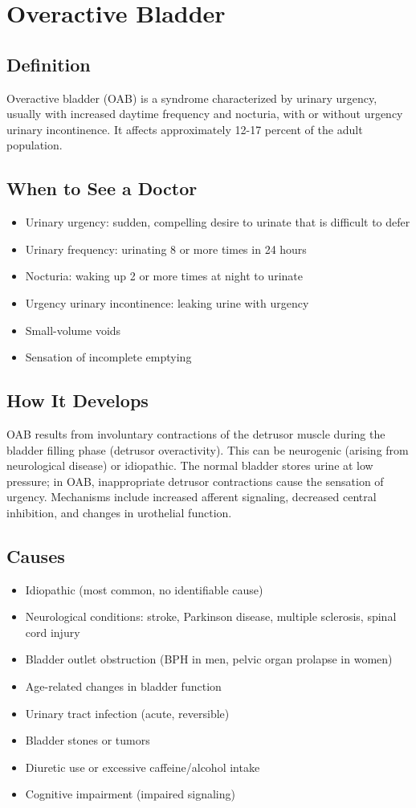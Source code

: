 \chapter{Overactive Bladder}

\section*{Definition}
Overactive bladder (OAB) is a syndrome characterized by urinary urgency, usually with increased daytime frequency and nocturia, with or without urgency urinary incontinence. It affects approximately 12-17 percent of the adult population.

\section*{When to See a Doctor}
\begin{itemize}
\item Urinary urgency: sudden, compelling desire to urinate that is difficult to defer
\item Urinary frequency: urinating 8 or more times in 24 hours
\item Nocturia: waking up 2 or more times at night to urinate
\item Urgency urinary incontinence: leaking urine with urgency
\item Small-volume voids
\item Sensation of incomplete emptying
\end{itemize}

\section*{How It Develops}
OAB results from involuntary contractions of the detrusor muscle during the bladder filling phase (detrusor overactivity). This can be neurogenic (arising from neurological disease) or idiopathic. The normal bladder stores urine at low pressure; in OAB, inappropriate detrusor contractions cause the sensation of urgency. Mechanisms include increased afferent signaling, decreased central inhibition, and changes in urothelial function.

\section*{Causes}
\begin{itemize}
\item Idiopathic (most common, no identifiable cause)
\item Neurological conditions: stroke, Parkinson disease, multiple sclerosis, spinal cord injury
\item Bladder outlet obstruction (BPH in men, pelvic organ prolapse in women)
\item Age-related changes in bladder function
\item Urinary tract infection (acute, reversible)
\item Bladder stones or tumors
\item Diuretic use or excessive caffeine/alcohol intake
\item Cognitive impairment (impaired signaling)
\end{itemize}

